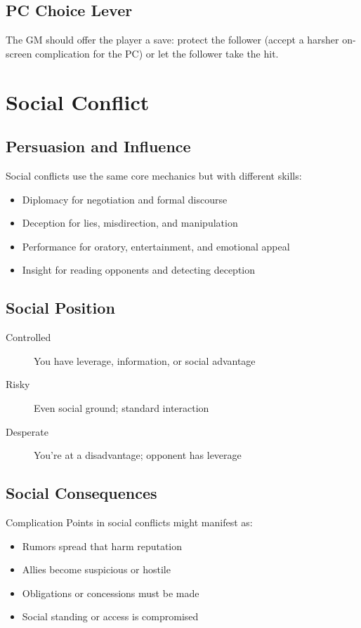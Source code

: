 \subsection{PC Choice Lever}

The GM should offer the player a save: protect the follower (accept a harsher on-screen complication for the PC) or let the follower take the hit.

\section{Social Conflict}

\subsection{Persuasion and Influence}

Social conflicts use the same core mechanics but with different skills:
\begin{itemize}
\item Diplomacy for negotiation and formal discourse
\item Deception for lies, misdirection, and manipulation
\item Performance for oratory, entertainment, and emotional appeal
\item Insight for reading opponents and detecting deception
\end{itemize}

\subsection{Social Position}

\begin{description}
\item[Controlled] You have leverage, information, or social advantage
\item[Risky] Even social ground; standard interaction
\item[Desperate] You're at a disadvantage; opponent has leverage
\end{description}

\subsection{Social Consequences}

Complication Points in social conflicts might manifest as:
\begin{itemize}
\item Rumors spread that harm reputation
\item Allies become suspicious or hostile
\item Obligations or concessions must be made
\item Social standing or access is compromised
\end{itemize}

